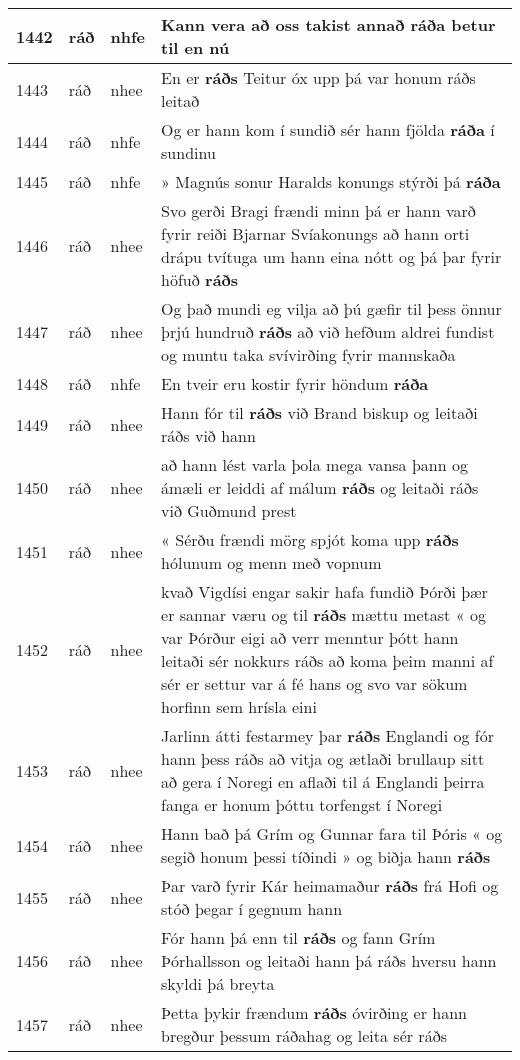 \documentclass{article}
\begin{document}
\begin{longtable}{p{1cm}|p{1cm}|p{1cm}|p{13cm}}
\hline
1442&ráð&nhfe&Kann vera að oss takist annað \textbf{ráða} betur til en nú\\
\hline
1443&ráð&nhee&En er \textbf{ráðs} Teitur óx upp þá var honum ráðs leitað\\
\hline
1444&ráð&nhfe&Og er hann kom í sundið sér hann fjölda \textbf{ráða} í sundinu\\
\hline
1445&ráð&nhfe&» Magnús sonur Haralds konungs stýrði þá \textbf{ráða} \\
\hline
1446&ráð&nhee&Svo gerði Bragi frændi minn þá er hann varð fyrir reiði Bjarnar Svíakonungs að hann orti drápu tvítuga um hann eina nótt og þá þar fyrir höfuð \textbf{ráðs} \\
\hline
1447&ráð&nhee&Og það mundi eg vilja að þú gæfir til þess önnur þrjú hundruð \textbf{ráðs} að við hefðum aldrei fundist og muntu taka svívirðing fyrir mannskaða\\
\hline
1448&ráð&nhfe&En tveir eru kostir fyrir höndum \textbf{ráða} \\
\hline
1449&ráð&nhee&Hann fór til \textbf{ráðs} við Brand biskup og leitaði ráðs við hann\\
\hline
1450&ráð&nhee&að hann lést varla þola mega vansa þann og ámæli er leiddi af málum \textbf{ráðs} og leitaði ráðs við Guðmund prest\\
\hline
1451&ráð&nhee&« Sérðu frændi mörg spjót koma upp \textbf{ráðs} hólunum og menn með vopnum\\
\hline
1452&ráð&nhee&kvað Vigdísi engar sakir hafa fundið Þórði þær er sannar væru og til \textbf{ráðs} mættu metast « og var Þórður eigi að verr menntur þótt hann leitaði sér nokkurs ráðs að koma þeim manni af sér er settur var á fé hans og svo var sökum horfinn sem hrísla eini\\
\hline
1453&ráð&nhee&Jarlinn átti festarmey þar \textbf{ráðs} Englandi og fór hann þess ráðs að vitja og ætlaði brullaup sitt að gera í Noregi en aflaði til á Englandi þeirra fanga er honum þóttu torfengst í Noregi\\
\hline
1454&ráð&nhee&Hann bað þá Grím og Gunnar fara til Þóris « og segið honum þessi tíðindi » og biðja hann \textbf{ráðs} \\
\hline
1455&ráð&nhee&Þar varð fyrir Kár heimamaður \textbf{ráðs} frá Hofi og stóð þegar í gegnum hann\\
\hline
1456&ráð&nhee&Fór hann þá enn til \textbf{ráðs} og fann Grím Þórhallsson og leitaði hann þá ráðs hversu hann skyldi þá breyta\\
\hline
1457&ráð&nhee&Þetta þykir frændum \textbf{ráðs} óvirðing er hann bregður þessum ráðahag og leita sér ráðs\\

\end{longtable}
\end{document}
